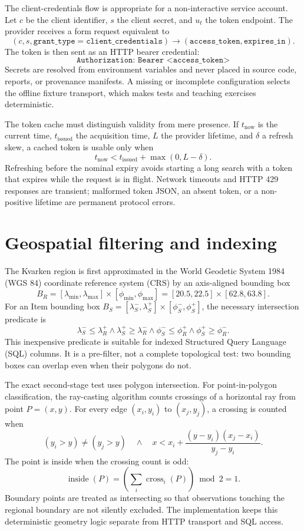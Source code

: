 The client-credentials flow is appropriate for a non-interactive service account. Let \(c\) be the
client identifier, \(s\) the client secret, and \(u_t\) the token endpoint. The provider receives a
form request equivalent to
\[
 (c, s, \texttt{grant\_type}=\texttt{client\_credentials}) \longrightarrow
 (\texttt{access\_token}, \texttt{expires\_in}).
\]
The token is then sent as an HTTP bearer credential:
\[
\texttt{Authorization: Bearer <access\_token>}
\]
Secrets are resolved from environment variables and never placed in source code, reports, or
provenance manifests. A missing or incomplete configuration selects the offline fixture transport,
which makes tests and teaching exercises deterministic.

The token cache must distinguish validity from mere presence. If \(t_{\mathrm{now}}\) is the
current time, \(t_{\mathrm{issued}}\) the acquisition time, \(L\) the provider lifetime, and
\(\delta\) a refresh skew, a cached token is usable only when
\[
t_{\mathrm{now}} < t_{\mathrm{issued}} + \max(0, L-\delta).
\]
Refreshing before the nominal expiry avoids starting a long search with a token that expires while
the request is in flight. Network timeouts and HTTP 429 responses are transient; malformed token
JSON, an absent token, or a non-positive lifetime are permanent protocol errors.

\section{Geospatial filtering and indexing}

The Kvarken region is first approximated in the World Geodetic System 1984 (WGS 84)
coordinate reference system (CRS) by an axis-aligned bounding box
\[
B_R=[\lambda_{\min},\lambda_{\max}]\times[\phi_{\min},\phi_{\max}]
=[20.5,22.5]\times[62.8,63.8].
\]
For an Item bounding box \(B_S=[\lambda^-_S,\lambda^+_S]\times[\phi^-_S,\phi^+_S]\), the
necessary intersection predicate is
\[
\lambda^-_S\leq\lambda^+_R \land
\lambda^+_S\geq\lambda^-_R \land
\phi^-_S\leq\phi^+_R \land
\phi^+_S\geq\phi^-_R.
\]
This inexpensive predicate is suitable for indexed Structured Query Language (SQL) columns. It is a pre-filter, not a complete
topological test: two bounding boxes can overlap even when their polygons do not.

The exact second-stage test uses polygon intersection. For point-in-polygon classification, the
ray-casting algorithm counts crossings of a horizontal ray from point \(P=(x,y)\). For every edge
\((x_i,y_i)\) to \((x_j,y_j)\), a crossing is counted when
\[
(y_i>y)\mathbin{\ne}(y_j>y)
\quad\land\quad
x < x_i + \frac{(y-y_i)(x_j-x_i)}{y_j-y_i}.
\]
The point is inside when the crossing count is odd:
\[
\operatorname{inside}(P)=\left(\sum_i \operatorname{cross}_i(P)\right)\bmod 2=1.
\]
Boundary points are treated as intersecting so that observations touching the regional boundary are
not silently excluded. The implementation keeps this deterministic geometry logic separate from
HTTP transport and SQL access.


